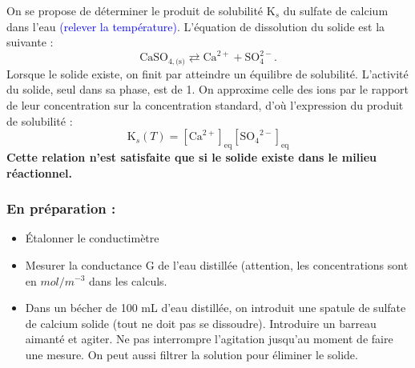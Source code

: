 \documentclass[11pt,a4paper]{report}
\begin{document}
On se propose de déterminer le produit de solubilité $\text{K}_s$ du sulfate de calcium dans l'eau \textcolor{blue}{(relever la température)}. L'équation de dissolution du solide est la suivante :
\begin{equation}
	\text{CaSO}_{4,\text{(s)}} \rightleftarrows \text{Ca}^{2+} + \text{SO}_4^{2-}.
\end{equation}
Lorsque le solide existe, on finit par atteindre un équilibre de solubilité. L'activité du solide, seul dans sa phase, est de 1. On approxime celle des ions par le rapport de leur concentration sur la concentration standard, d'où l'expression du produit de solubilité :
\begin{equation}
	\boxed{\text{K}_s(T) = [\text{Ca}^{2+}]_\text{eq} [{\text{SO}_4}^{2-}]_\text{eq}}
\end{equation}
\textbf{Cette relation n'est satisfaite que si le solide existe dans le milieu réactionnel.}

\subsubsection{En préparation :}

\begin{itemize}
	\item Étalonner le conductimètre
	\item Mesurer la conductance G de l'eau distillée (attention, les concentrations sont 
		en $mol/m^{-3}$ dans les calculs.
	\item Dans un bécher de 100 mL d'eau distillée, on introduit une spatule de sulfate de calcium 			solide (tout ne doit pas se dissoudre). Introduire un barreau aimanté et agiter. Ne pas 				interrompre l'agitation jusqu'au moment de faire une mesure. On peut aussi filtrer la solution 			pour éliminer le solide.
\end{itemize}
\end{document}
